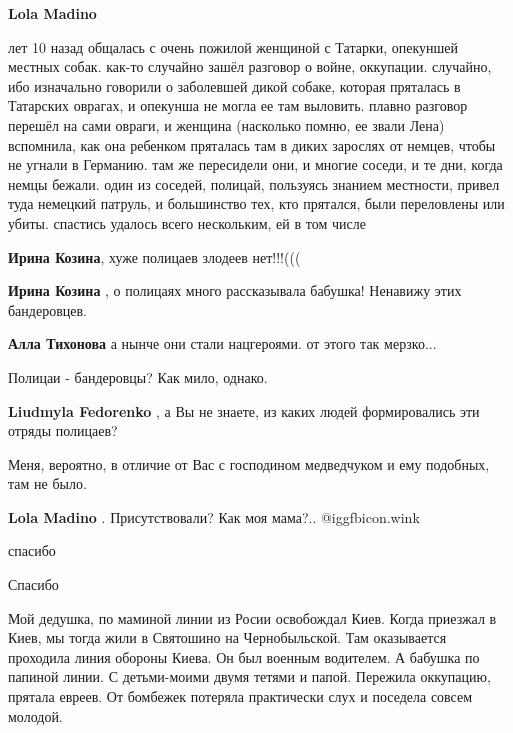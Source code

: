 \begin{itemize}
\begin{itemize}
\textbf{Lola Madino} 

лет 10 назад общалась с очень пожилой женщиной с Татарки, опекуншей местных
собак. как-то случайно зашёл разговор о войне, оккупации. случайно, ибо
изначально говорили о заболевшей дикой собаке, которая пряталась в Татарских
оврагах, и опекунша не могла ее там выловить. плавно разговор перешёл на сами
овраги, и женщина (насколько помню, ее звали Лена) вспомнила, как она ребенком
пряталась там в диких зарослях от немцев, чтобы не угнали в Германию. там же
пересидели они, и многие соседи, и те дни, когда немцы бежали. один из соседей,
полицай, пользуясь знанием местности, привел туда немецкий патруль, и
большинство тех, кто прятался, были переловлены или убиты. спастись удалось
всего нескольким, ей в том числе

\begin{itemize} %
\textbf{Ирина Козина}, хуже полицаев злодеев нет!!!(((

\textbf{Ирина Козина} , о полицаях много рассказывала бабушка! Ненавижу этих бандеровцев.

\textbf{Алла Тихонова} а нынче они стали нацгероями. от этого так мерзко...
\end{itemize} %

Полицаи - бандеровцы? Как мило, однако.

\textbf{Liudmyla Fedorenko} , а Вы не знаете, из каких людей формировались эти отряды полицаев?

Меня, вероятно, в отличие от Вас с господином медведчуком и ему подобных, там не было.

\textbf{Lola Madino} . Присутствовали? Как моя мама?..  @igg{fbicon.wink} 

\end{itemize} %

спасибо

Спасибо


Мой дедушка, по маминой линии из Росии освобождал Киев. Когда приезжал в Киев,
мы тогда жили в Святошино на Чернобыльской. Там оказывается проходила линия
обороны Киева. Он был военным водителем. А бабушка по папиной линии. С
детьми-моими двумя тетями и папой. Пережила оккупацию, прятала евреев. От бомбежек
потеряла практически слух и поседела совсем молодой.


\end{itemize}
